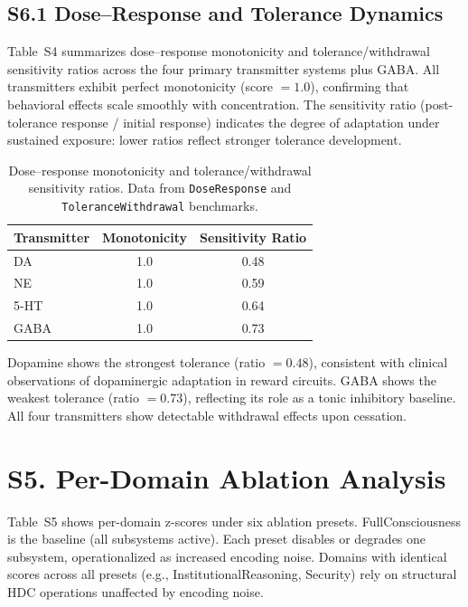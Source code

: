 \documentclass[10pt,landscape]{article}
\begin{document}
\subsection*{S6.1 Dose--Response and Tolerance Dynamics}

Table~S4 summarizes dose--response monotonicity and tolerance/withdrawal sensitivity ratios across the four primary transmitter systems plus GABA. All transmitters exhibit perfect monotonicity (score $= 1.0$), confirming that behavioral effects scale smoothly with concentration. The sensitivity ratio (post-tolerance response / initial response) indicates the degree of adaptation under sustained exposure: lower ratios reflect stronger tolerance development.

\begin{table}[h]
\centering
\caption{Dose--response monotonicity and tolerance/withdrawal sensitivity ratios. Data from \texttt{DoseResponse} and \texttt{ToleranceWithdrawal} benchmarks.} \label{tab:s4}
\begin{tabular}{@{}lcc@{}}
\toprule
\textbf{Transmitter} & \textbf{Monotonicity} & \textbf{Sensitivity Ratio} \\
\midrule
DA   & 1.0 & 0.48 \\
NE   & 1.0 & 0.59 \\
5-HT & 1.0 & 0.64 \\
GABA & 1.0 & 0.73 \\
\bottomrule
\end{tabular}
\end{table}

\noindent Dopamine shows the strongest tolerance (ratio $= 0.48$), consistent with clinical observations of dopaminergic adaptation in reward circuits. GABA shows the weakest tolerance (ratio $= 0.73$), reflecting its role as a tonic inhibitory baseline. All four transmitters show detectable withdrawal effects upon cessation.

\clearpage
\section*{S5. Per-Domain Ablation Analysis}

Table~S5 shows per-domain z-scores under six ablation presets. FullConsciousness is the baseline (all subsystems active). Each preset disables or degrades one subsystem, operationalized as increased encoding noise. Domains with identical scores across all presets (e.g., InstitutionalReasoning, Security) rely on structural HDC operations unaffected by encoding noise.
\end{document}
